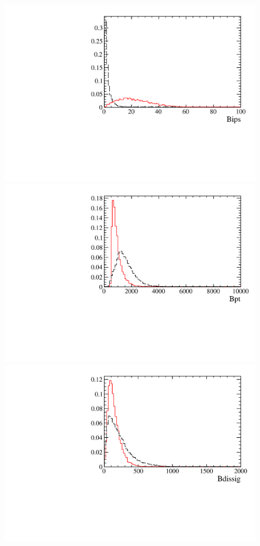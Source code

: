 \begin{figure} [htb!]
\begin{center}
\includegraphics[scale=0.20]{figs/BipsPARTIALptcut.pdf}
\includegraphics[scale=0.20]{figs/BptPARTIALptcut.pdf}
\includegraphics[scale=0.20]{figs/BdissigPARTIALptcut.pdf}

\end{center}
\end{figure}
